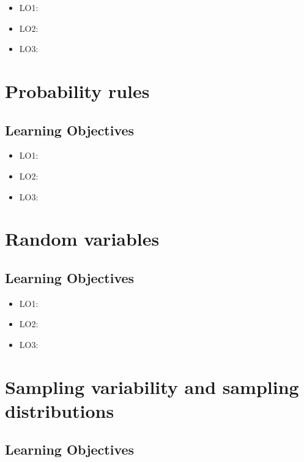 \documentclass[12pt,]{krantz}
\providecommand{\tightlist}{%
  \setlength{\itemsep}{0pt}\setlength{\parskip}{0pt}}
\begin{document}
\begin{itemize}
\tightlist
\item
  LO1:
\item
  LO2:
\item
  LO3:
\end{itemize}

\hypertarget{chap-probability-rules}{%
\section{Probability rules}\label{chap-probability-rules}}

\hypertarget{learning-objectives-6}{%
\subsection*{Learning Objectives}\label{learning-objectives-6}}

\begin{itemize}
\tightlist
\item
  LO1:
\item
  LO2:
\item
  LO3:
\end{itemize}

\hypertarget{chap-random-variables}{%
\section{Random variables}\label{chap-random-variables}}

\hypertarget{learning-objectives-7}{%
\subsection*{Learning Objectives}\label{learning-objectives-7}}

\begin{itemize}
\tightlist
\item
  LO1:
\item
  LO2:
\item
  LO3:
\end{itemize}

\hypertarget{chap-sampling}{%
\section{Sampling variability and sampling distributions}\label{chap-sampling}}

\hypertarget{learning-objectives-8}{%
\subsection*{Learning Objectives}\label{learning-objectives-8}}
\end{document}
